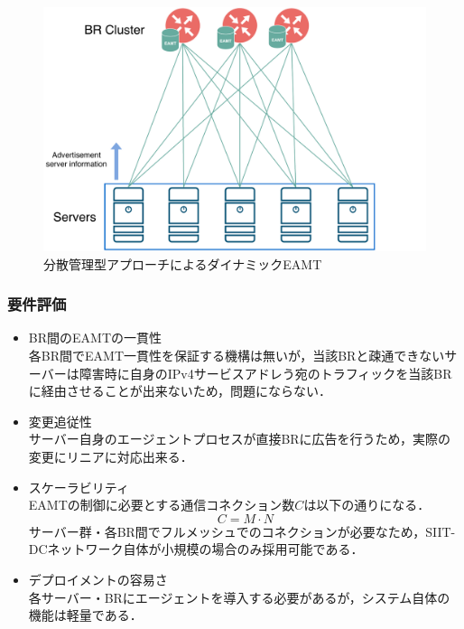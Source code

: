 \begin{figure}[h]
    \begin{center}
      \includegraphics[width=12cm,pagebox=cropbox,clip]{img/approach_distributed_model.pdf}
    \end{center}
    \caption{分散管理型アプローチによるダイナミックEAMT}
    \label{fig:approach_distributed_model}
\end{figure}

\subsubsection{要件評価}

\begin{itemize}
    \item BR間のEAMTの一貫性 \\
    各BR間でEAMT一貫性を保証する機構は無いが，当該BRと疎通できないサーバーは障害時に自身のIPv4サービスアドレう宛のトラフィックを当該BRに経由させることが出来ないため，問題にならない．
    \item 変更追従性 \\
    サーバー自身のエージェントプロセスが直接BRに広告を行うため，実際の変更にリニアに対応出来る．
    \item スケーラビリティ　\\
    EAMTの制御に必要とする通信コネクション数$C$は以下の通りになる．
    \begin{equation}
        C =  M \cdot N 
    \end{equation}
    サーバー群・各BR間でフルメッシュでのコネクションが必要なため，SIIT-DCネットワーク自体が小規模の場合のみ採用可能である．

    \item デプロイメントの容易さ　\\
    各サーバー・BRにエージェントを導入する必要があるが，システム自体の機能は軽量である．
\end{itemize}

